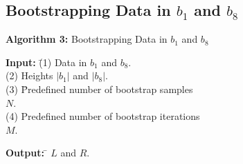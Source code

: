 \documentclass[a4paper,fleqn]{cas-dc}
\begin{document}
\subsection{Bootstrapping Data in $b_{1}$ and $b_{8}$}
\vspace{0.2in}
\noindent
{\bf Algorithm 3:} Bootstrapping Data in $b_{1}$ and $b_{8}$
\begin{tabbing}
{\bf Input: } \= (1) Data in $b_{1}$ and $b_{8}$. \\
              \> (2) Heights $|b_{1}|$ and $|b_{8}|$. \\
              \> (3) \= Predefined number of bootstrap samples \\
              \>     \> $N$. \\
              \> (4) Predefined number of bootstrap iterations \\
              \>     \> $M$.
\end{tabbing}
\begin{tabbing}
{\bf Output:} \= $L$ and $R$.
\end{tabbing}
\end{document}
